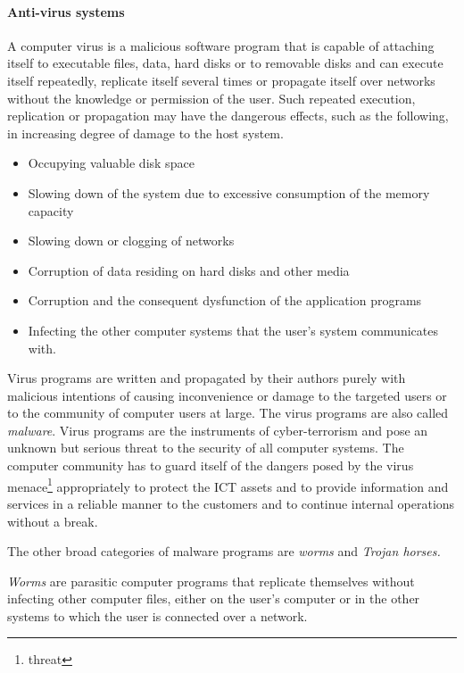  \paragraph{Anti-virus systems}
 A computer virus is a malicious software program that is capable of attaching itself to executable files, data, hard disks or to removable disks and can execute itself repeatedly, replicate itself several times or propagate itself over networks without the knowledge or permission of the user. Such repeated execution, replication or propagation may have the dangerous effects, such as the following, in increasing degree of damage to the host system.
 
 \begin{itemize}
 	\item Occupying valuable disk space
 	\item Slowing down of the system due to excessive consumption of the memory
 	capacity
 	
 	\item Slowing down or clogging of networks
 	
 	\item Corruption of data residing on hard disks and other media
 	
 	\item Corruption and the consequent dysfunction of the application programs
 	
 	\item Infecting the other computer systems that the user’s system communicates with.
 \end{itemize}

Virus programs are written and propagated by their authors purely with malicious
intentions of causing inconvenience or damage to the targeted users or to the community
of computer users at large. The virus programs are also called \textit{malware}. Virus programs are
the instruments of cyber-terrorism and pose an unknown but serious threat to the security
of all computer systems. The computer community has to guard itself of the dangers posed
by the virus menace\footnote{threat} appropriately to protect the ICT assets and to provide
information and services in a reliable manner to the customers and to continue internal
operations without a break.

The other broad categories of malware programs are \textit{worms} and \textit{Trojan horses.}

\textit{Worms} are parasitic computer programs that replicate themselves without infecting other
computer files, either on the user’s computer or in the other systems to which the user is
connected over a network. 

